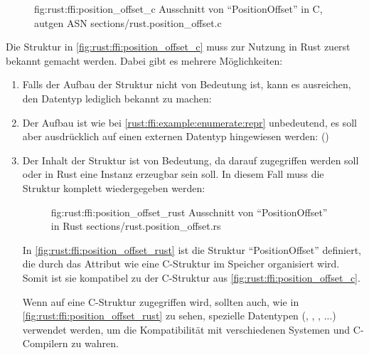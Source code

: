 \begin{figure}[H]
	\ccinclude
		{fig:rust:ffi:position_offset_c}
		{Ausschnitt von \enquote{PositionOffset}  in C, autgen ASN}
		{sections/rust.position_offset.c}
	
\end{figure}

Die Struktur in \autoref{fig:rust:ffi:position_offset_c} muss zur Nutzung in Rust zuerst bekannt gemacht werden.
Dabei gibt es mehrere Möglichkeiten:
\begin{enumerate}
	\item Falls der Aufbau der Struktur nicht von Bedeutung ist, kann es ausreichen, den Datentyp lediglich bekannt zu machen:  \label{rust:ffi:example:enumerate:repr}
	
	\item Der Aufbau ist wie bei \autoref{rust:ffi:example:enumerate:repr} unbedeutend, es soll aber ausdrücklich auf einen externen Datentyp hingewiesen werden:  \cite{rust:github:extern_type} ()
	
	\item Der Inhalt der Struktur ist von Bedeutung, da darauf zugegriffen werden soll oder in Rust eine Instanz erzeugbar sein soll. In diesem Fall muss die Struktur komplett wiedergegeben werden:
	\begin{figure}[H]
		\rustcinclude
			{fig:rust:ffi:position_offset_rust}
			{Ausschnitt von \enquote{PositionOffset}  in Rust}
			{sections/rust.position_offset.rs}
	\end{figure}
	
	In \autoref{fig:rust:ffi:position_offset_rust} ist die Struktur \enquote{PositionOffset} definiert,
	die durch das Attribut  wie eine C-Struktur im Speicher organisiert wird.
	Somit ist sie kompatibel zu der C-Struktur aus \autoref{fig:rust:ffi:position_offset_c}.
	
	Wenn auf eine C-Struktur zugegriffen wird, sollten auch, wie in \autoref{fig:rust:ffi:position_offset_rust} zu sehen, spezielle Datentypen (, , , ...) verwendet werden, um die Kompatibilität mit verschiedenen Systemen und C-Compilern zu wahren. 
	
	

\end{enumerate}
